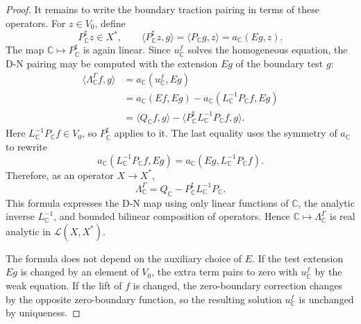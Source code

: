\documentclass[10pt,a4paper]{amsart}
\newcommand{\cL}{\mathcal L}
\newcommand{\dual}[2]{\langle #1,#2\rangle}
\begin{document}
\begin{proof}
It remains to write the boundary traction pairing in terms of these operators.  For $z\in V_0$, define
\[
        P_{\mathbb C}^{\sharp}z\in X^*,
        \qquad
        \dual{P_{\mathbb C}^{\sharp}z}{g}
        =\dual{P_{\mathbb C}g}{z}
        =a_{\mathbb C}(Eg,z).
\]
The map $\mathbb C\mapsto P_{\mathbb C}^{\sharp}$ is again linear.  Since $u_{\mathbb C}^f$ solves the homogeneous equation, the D-N pairing may be computed with the extension $Eg$ of the boundary test $g$:
\[
\begin{aligned}
        \dual{\Lambda_{\mathbb C}^\Gamma f}{g}
        &=a_{\mathbb C}(u_{\mathbb C}^f,Eg) \\
        &=a_{\mathbb C}(Ef,Eg)
          -a_{\mathbb C}(L_{\mathbb C}^{-1}P_{\mathbb C}f,Eg) \\
        &=\dual{Q_{\mathbb C}f}{g}
          -\dual{P_{\mathbb C}^{\sharp}L_{\mathbb C}^{-1}P_{\mathbb C}f}{g}.
\end{aligned}
\]
Here $L_{\mathbb C}^{-1}P_{\mathbb C}f\in V_0$, so $P_{\mathbb C}^{\sharp}$ applies to it.  The last equality uses the symmetry of $a_{\mathbb C}$ to rewrite
\[
        a_{\mathbb C}(L_{\mathbb C}^{-1}P_{\mathbb C}f,Eg)
        =a_{\mathbb C}(Eg,L_{\mathbb C}^{-1}P_{\mathbb C}f).
\]
Therefore, as an operator $X\to X^*$,
\[
        \Lambda_{\mathbb C}^\Gamma
        =Q_{\mathbb C}
        -P_{\mathbb C}^{\sharp}L_{\mathbb C}^{-1}P_{\mathbb C}.
\]
This formula expresses the D-N map using only linear functions of $\mathbb C$, the analytic inverse $L_{\mathbb C}^{-1}$, and bounded bilinear composition of operators.  Hence $\mathbb C\mapsto\Lambda_{\mathbb C}^\Gamma$ is real analytic in $\cL(X,X^*)$.

The formula does not depend on the auxiliary choice of $E$.  If the test extension $Eg$ is changed by an element of $V_0$, the extra term pairs to zero with $u_{\mathbb C}^f$ by the weak equation.  If the lift of $f$ is changed, the zero-boundary correction changes by the opposite zero-boundary function, so the resulting solution $u_{\mathbb C}^f$ is unchanged by uniqueness.
\end{proof}
\end{document}
